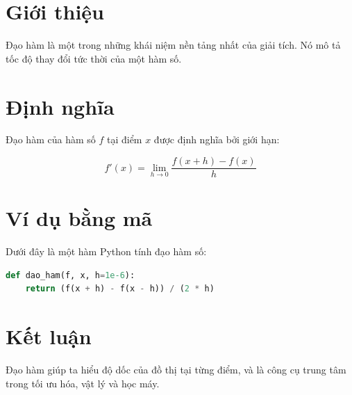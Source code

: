 \section{Giới thiệu}

Đạo hàm là một trong những khái niệm nền tảng nhất của giải tích.
Nó mô tả tốc độ thay đổi tức thời của một hàm số.

\section{Định nghĩa}

Đạo hàm của hàm số \(f\) tại điểm \(x\) được định nghĩa bởi giới hạn:

\begin{equation}
f'(x) = \lim_{h \to 0} \frac{f(x+h)-f(x)}{h}
\end{equation}

\section{Ví dụ bằng mã}

Dưới đây là một hàm Python tính đạo hàm số:

\begin{lstlisting}[language=Python]
def dao_ham(f, x, h=1e-6):
    return (f(x + h) - f(x - h)) / (2 * h)
\end{lstlisting}

\section{Kết luận}

Đạo hàm giúp ta hiểu độ dốc của đồ thị tại từng điểm, và là công cụ
trung tâm trong tối ưu hóa, vật lý và học máy.
